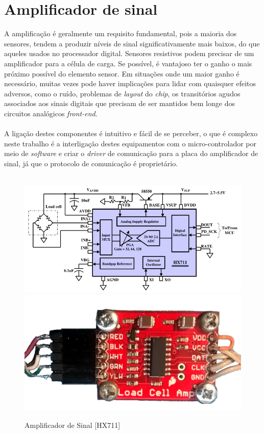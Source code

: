 \section{Amplificador de sinal}
A amplificação é geralmente um requisito fundamental, pois a maioria dos sensores, tendem a produzir níveis de sinal significativamente mais baixos, do que aqueles usados no processador digital. Sensores resistivos podem precisar de um amplificador para a célula de carga. Se possível, é vantajoso ter o ganho o mais próximo possível do elemento sensor. Em situações onde um maior ganho é necessário, muitas vezes pode haver implicações para lidar com quaisquer efeitos adversos, como o ruído, problemas de \textit{layout} do \textit{chip}, os transitórios agudos associados aos sinais digitais que precisam de ser mantidos bem longe dos circuitos analógicos \textit{front-end}. \cite{book-9}
\\
\\
A ligação destes componentes é intuitivo e fácil de se perceber, o que é complexo neste trabalho é a interligação destes equipamentos com o micro-controlador por meio de \textit{software} e criar o \textit{driver} de comunicação para a placa do amplificador de sinal, já que o protocolo de comunicação é proprietário.
\\
\\
\begin{figure}[H]
	\captionsetup{justification=raggedright,singlelinecheck=false}
	\centering
	\includegraphics[scale=0.35]{./image/PESTA/schematic/HX711_Schematic_1.jpg}
	\includegraphics[scale=0.1]{./image/PESTA/material/HX711_board_1.jpg}
	\caption{Amplificador de Sinal [HX711]}
	\label{HX711_Schematic_1}
\end{figure}
